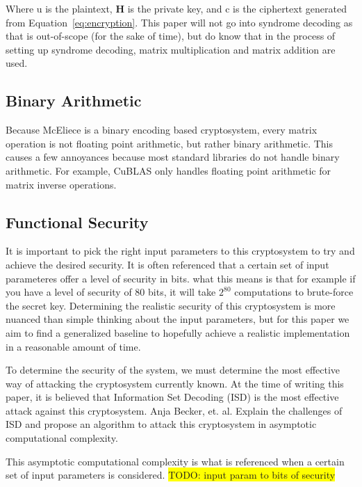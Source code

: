 \documentclass[conference]{IEEEtran}
\begin{document}
            Where u is the plaintext, \textbf{H} is the private key, and c is the ciphertext generated from Equation~\ref{eq:encryption}. This paper will not go into syndrome decoding as that is out-of-scope (for the sake of time), but do know that in the process of setting up syndrome decoding, matrix multiplication and matrix addition are used.

    \subsection{Binary Arithmetic}
        Because McEliece is a binary encoding based cryptosystem, every matrix operation is not floating point arithmetic, but rather binary arithmetic. This causes a few annoyances because most standard libraries do not handle binary arithmetic. For example, CuBLAS only handles floating point arithmetic for matrix inverse operations.

    \subsection{Functional Security}
        It is important to pick the right input parameters to this cryptosystem to try and achieve the desired security. It is often referenced that a certain set of input parameteres offer a level of security in bits\cite{10.1109/ISIT.2013.6620590, 10.1007/978-3-642-29011-4_31}. what this means is that for example if you have a level of security of 80 bits, it will take $2^{80}$ computations to brute-force the secret key. Determining the realistic security of this cryptosystem is more nuanced than simple thinking about the input parameters, but for this paper we aim to find a generalized baseline to hopefully achieve a realistic implementation in a reasonable amount of time. 
        
        To determine the security of the system, we must determine the most effective way of attacking the cryptosystem currently known. At the time of writing this paper, it is believed that Information Set Decoding (ISD) is the most effective attack against this cryptosystem. Anja Becker, et. al. Explain the challenges of ISD and propose an algorithm to attack this cryptosystem in asymptotic computational complexity\cite{10.1007/978-3-642-29011-4_31}. 
        
        This asymptotic computational complexity is what is referenced when a certain set of input parameters is considered. \colorbox{yellow}{TODO: input param to bits of security}
\end{document}
